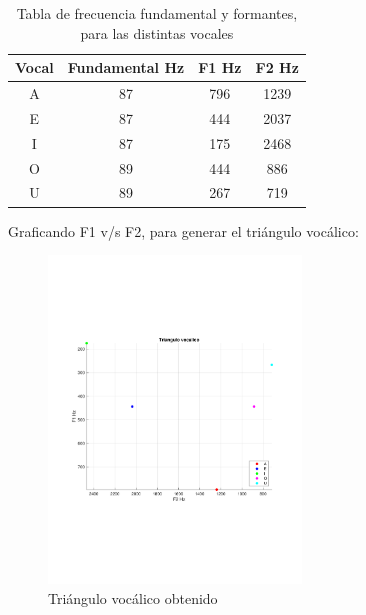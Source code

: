 	\begin{table}[H]
		\center
		\begin{tabular}{|c|c|c|c|}
			\hline
			\textbf{Vocal} & \textbf{Fundamental Hz} & \textbf{F1 Hz} & \textbf{F2 Hz} \\
			\hline 
			A & 87 & 796 & 1239 \\
			\hline
			E & 87 & 444 & 2037 \\
			\hline
			I & 87 & 175 & 2468 \\
			\hline
			O & 89 & 444 & 886 \\
			\hline
			U & 89 & 267 & 719 \\
			\hline
		\end{tabular}
		\caption{Tabla de frecuencia fundamental y formantes, para las distintas vocales}
		\label{tab:formantes-freq}
	\end{table}
	
	Graficando F1 v/s F2, para generar el triángulo vocálico:

	\begin{figure}[H]
		\center
		\includegraphics[width=0.6\textwidth,clip, trim = {1.9cm 6.8cm 2.3cm 7cm}]{../plots/vocalic_triang.pdf}
		\caption{Triángulo vocálico obtenido}
		\label{fig:vocal_triang}
	\end{figure}
	
